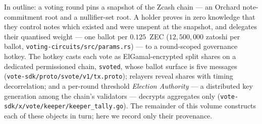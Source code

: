 \documentclass[11pt,a4paper]{article}
\theoremstyle{definition}
\begin{document}
In outline: a voting round pins a snapshot of the Zcash chain --- an Orchard
note-commitment root and a nullifier-set root. A holder proves in zero
knowledge that they control notes which existed and were unspent at the
snapshot, and delegates their quantised weight --- one ballot per $0.125$~ZEC
($12{,}500{,}000$ zatoshi per ballot,
\texttt{voting-circuits/src/params.rs}) --- to a round-scoped governance
hotkey. The hotkey casts each vote as ElGamal-encrypted split shares on a
dedicated permissioned chain, \texttt{svoted}, whose ballot surface is five
messages (\texttt{vote-sdk/proto/svote/v1/tx.proto}); relayers reveal shares
with timing decorrelation; and a per-round threshold \emph{Election
Authority} --- a distributed key generation among the chain's validators ---
decrypts aggregates only (\texttt{vote-sdk/x/vote/keeper/keeper\_tally.go}).
The remainder of this volume constructs each of these objects in turn; here
we record only their provenance.
\end{document}
